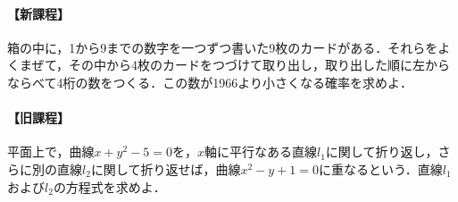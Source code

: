 \documentclass[../../main.tex]{subfiles}
\begin{document}
\paragraph{【新課程】}
箱の中に，1から9までの数字を一つずつ書いた9枚のカードがある．それらをよくまぜて，その中から4枚のカードをつづけて取り出し，取り出した順に左からならべて4桁の数をつくる．この数が1966より小さくなる確率を求めよ．

\paragraph{【旧課程】}
平面上で，曲線$x+y^2-5=0$を，$x$軸に平行なある直線$l_1$に関して折り返し，さらに別の直線$l_2$に関して折り返せば，曲線$x^2-y+1=0$に重なるという．直線$l_1$および$l_2$の方程式を求めよ．
\end{document}
